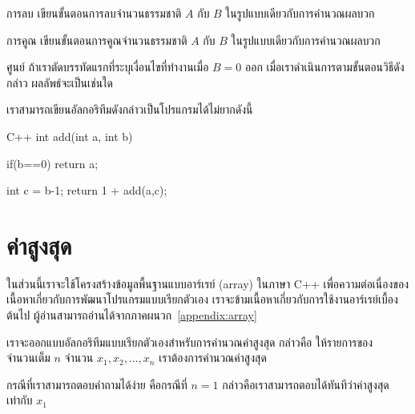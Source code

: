 \begin{quiz}{การ{\wbr}ลบ}
เขียน{\wbr}ขั้นตอน{\wbr}การ{\wbr}ลบ{\wbr}จำนวน{\wbr}ธรรมชาติ $A$ กับ $B$ ใน{\wbr}รูปแบบ{\wbr}เดียวกับ{\wbr}การ{\wbr}คำนวณ{\wbr}ผลบวก{\wbr}
\end{quiz}

\begin{quiz}{การ{\wbr}คูณ}
เขียน{\wbr}ขั้นตอน{\wbr}การ{\wbr}คูณ{\wbr}จำนวน{\wbr}ธรรมชาติ $A$ กับ $B$ ใน{\wbr}รูปแบบ{\wbr}เดียวกับ{\wbr}การ{\wbr}คำนวณ{\wbr}ผลบวก{\wbr}
\end{quiz}

\begin{quiz}{ศูนย์}
ถ้า{\wbr}เรา{\wbr}ตัด{\wbr}บรรทัด{\wbr}แรก{\wbr}ที่{\wbr}ระบุ{\wbr}เงื่อนไข{\wbr}ที่ทำงาน{\wbr}เมื่อ $B=0$ ออก  เมื่อ{\wbr}เรา{\wbr}ดำเนินการ{\wbr}ตาม{\wbr}ขั้นตอนวิธี{\wbr}ดังกล่าว ผลลัพธ์{\wbr}จะ{\wbr}เป็น{\wbr}เช่น{\wbr}ใด{\wbr}
\end{quiz}

เรา{\wbr}สามารถ{\wbr}เขียน{\wbr}อัล{\wbr}กอ{\wbr}ริ{\wbr}ทึม{\wbr}ดังกล่าว{\wbr}เป็น{\wbr}โปรแกรม{\wbr}ได้{\wbr}ไม่{\wbr}ยาก{\wbr}ดังนี้{\wbr}

\latintext
\begin{codelist}{C++}
int add(int a, int b)
{
  if(b==0)
    return a;

  int c = b-1;
  return 1 + add(a,c);
}
\end{codelist}
\thaitext

\section{ค่าสูงสุด}

ใน{\wbr}ส่วน{\wbr}นี้{\wbr}เรา{\wbr}จะ{\wbr}ใช้{\wbr}โครงสร้าง{\wbr}ข้อมูล{\wbr}พื้นฐาน{\wbr}แบบ{\wbr}อาร์เรย์ (array) ใน{\wbr}ภาษา C++
เพื่อ{\wbr}ความ{\wbr}ต่อเนื่อง{\wbr}ของ{\wbr}เนื้อหา{\wbr}เกี่ยวกับ{\wbr}การ{\wbr}พัฒนา{\wbr}โปรแกรม{\wbr}แบบ{\wbr}เรียก{\wbr}ตัวเอง{\wbr}
เรา{\wbr}จะ{\wbr}ข้าม{\wbr}เนื้อหา{\wbr}เกี่ยวกับ{\wbr}การ{\wbr}ใช้{\wbr}งาน{\wbr}อาร์เรย์{\wbr}เบื้องต้น{\wbr}ไป{\wbr}
ผู้อ่าน{\wbr}สามารถ{\wbr}อ่าน{\wbr}ได้{\wbr}จาก{\wbr}ภาคผนวก~\ref{appendix:array}

เรา{\wbr}จะ{\wbr}ออกแบบ{\wbr}อัล{\wbr}กอ{\wbr}ริ{\wbr}ทึม{\wbr}แบบ{\wbr}เรียก{\wbr}ตัวเอง{\wbr}สำหรับ{\wbr}การ{\wbr}คำนวณ{\wbr}ค่าสูงสุด กล่าวคือ{\wbr}
ให้{\wbr}รายการ{\wbr}ของ{\wbr}จำนวนเต็ม $n$ จำนวน $x_1,x_2,\ldots,x_n$
เรา{\wbr}ต้องการ{\wbr}คำนวณ{\wbr}ค่าสูงสุด{\wbr}

กรณี{\wbr}ที่{\wbr}เรา{\wbr}สามารถ{\wbr}ตอบ{\wbr}คำถาม{\wbr}ได้{\wbr}ง่าย คือ{\wbr}กรณี{\wbr}ที่ $n=1$
กล่าวคือ{\wbr}เรา{\wbr}สามารถ{\wbr}ตอบ{\wbr}ได้{\wbr}ทันที{\wbr}ว่า{\wbr}ค่าสูงสุด{\wbr}เท่า{\wbr}กับ $x_1$

